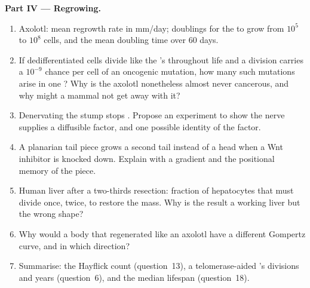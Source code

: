 \begin{problem}
\medskip
\noindent\textbf{Part IV --- Regrowing.}
\begin{enumerate}[resume]
  \item Axolotl: mean regrowth rate in mm/day; doublings for the
         to grow from $10^{5}$ to $10^{8}$ cells, and the mean
        doubling time over 60 days.
  \item If dedifferentiated cells divide like the 's throughout
        life and a division carries a $10^{-9}$ chance per cell of an
        oncogenic mutation, how many such mutations arise in one
        ? Why is the axolotl nonetheless almost never
        cancerous, and why might a mammal not get away with it?
  \item Denervating the stump stops . Propose an experiment
        to show the nerve supplies a diffusible factor, and one
        possible identity of the factor.
  \item A planarian tail piece grows a second tail instead of a head
        when a Wnt inhibitor is knocked down. Explain with a gradient
        and the positional memory of the piece.
  \item Human liver after a two-thirds resection: fraction of
        hepatocytes that must divide once, twice, to restore the mass.
        Why is the result a working liver but the wrong shape?
  \item Why would a body that regenerated like an axolotl have a
        different Gompertz curve, and in which direction?
  \item Summarise: the Hayflick count (question~13), a telomerase-aided
        's divisions and years (question~6), and the median
        lifespan (question~18).
\end{enumerate}
\end{problem}
